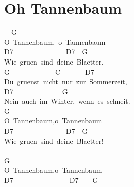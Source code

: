 \documentclass[]{book}
\let\stdsection\section
\renewcommand\section{\clearpage\stdsection}
\begin{document}
\hypertarget{oh-tannenbaum}{%
\section{Oh Tannenbaum}\label{oh-tannenbaum}}

~~G~~~~~~~~~~~\\
O~Tannenbaum,~o~Tannenbaum\\
\hspace*{0.333em}\hspace*{0.333em}\hspace*{0.333em}\hspace*{0.333em}D7~~~~~~~~~~~~~~~D7~~G~~~~~~~\\
Wie~gruen~sind~deine~Blaetter.\\
\hspace*{0.333em}\hspace*{0.333em}\hspace*{0.333em}G~~~~~~~~~~~~~C~~~~~~~D7~~~~~~\\
Du~gruenst~nicht~nur~zur~Sommerzeit,\\
\hspace*{0.333em}\hspace*{0.333em}\hspace*{0.333em}\hspace*{0.333em}\hspace*{0.333em}D7~~~~~~~~~~~~~~G~~~~~~\\
Nein~auch~im~Winter,~wenn~es~schneit.\\
\hspace*{0.333em}\hspace*{0.333em}G~~~~~~~\\
O~Tannenbaum,o~Tannenbaum\\
\hspace*{0.333em}\hspace*{0.333em}\hspace*{0.333em}\hspace*{0.333em}D7~~~~~~~~~~~~~~~D7~~G~~~~~~\\
Wie~gruen~sind~deine~Blaetter!\\
\hspace*{0.333em}\hspace*{0.333em}\\
\hspace*{0.333em}\hspace*{0.333em}G~~~\\
O~Tannenbaum,o~Tannenbaum~\\
\hspace*{0.333em}\hspace*{0.333em}\hspace*{0.333em}D7~~~~~~~~~~~~~~~~D7~~~~G~~~~~~~\\
\end{document}
